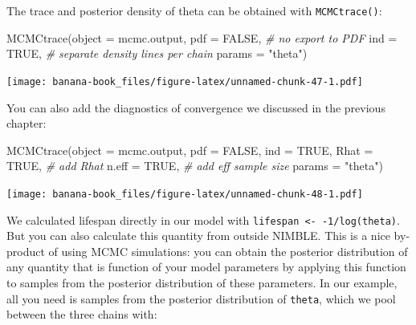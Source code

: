 \documentclass[
  12pt,
]{krantz}
\newenvironment{Shaded}{\begin{snugshade}}{\end{snugshade}}
\newcommand{\AttributeTok}[1]{\textcolor[rgb]{0.77,0.63,0.00}{#1}}
\newcommand{\CommentTok}[1]{\textcolor[rgb]{0.56,0.35,0.01}{\textit{#1}}}
\newcommand{\ConstantTok}[1]{\textcolor[rgb]{0.00,0.00,0.00}{#1}}
\newcommand{\FunctionTok}[1]{\textcolor[rgb]{0.00,0.00,0.00}{#1}}
\newcommand{\NormalTok}[1]{#1}
\newcommand{\OtherTok}[1]{\textcolor[rgb]{0.56,0.35,0.01}{#1}}
\newcommand{\SpecialCharTok}[1]{\textcolor[rgb]{0.00,0.00,0.00}{#1}}
\newcommand{\StringTok}[1]{\textcolor[rgb]{0.31,0.60,0.02}{#1}}
\begin{document}
The trace and posterior density of theta can be obtained with \texttt{MCMCtrace()}:

\begin{Shaded}
\begin{Highlighting}[]
\FunctionTok{MCMCtrace}\NormalTok{(}\AttributeTok{object =}\NormalTok{ mcmc.output,}
          \AttributeTok{pdf =} \ConstantTok{FALSE}\NormalTok{, }\CommentTok{\# no export to PDF}
          \AttributeTok{ind =} \ConstantTok{TRUE}\NormalTok{, }\CommentTok{\# separate density lines per chain}
          \AttributeTok{params =} \StringTok{"theta"}\NormalTok{)}
\end{Highlighting}
\end{Shaded}

\texttt{[image: banana-book\_files/figure-latex/unnamed-chunk-47-1.pdf]}

You can also add the diagnostics of convergence we discussed in the previous chapter:

\begin{Shaded}
\begin{Highlighting}[]
\FunctionTok{MCMCtrace}\NormalTok{(}\AttributeTok{object =}\NormalTok{ mcmc.output,}
          \AttributeTok{pdf =} \ConstantTok{FALSE}\NormalTok{,}
          \AttributeTok{ind =} \ConstantTok{TRUE}\NormalTok{,}
          \AttributeTok{Rhat =} \ConstantTok{TRUE}\NormalTok{, }\CommentTok{\# add Rhat}
          \AttributeTok{n.eff =} \ConstantTok{TRUE}\NormalTok{, }\CommentTok{\# add eff sample size}
          \AttributeTok{params =} \StringTok{"theta"}\NormalTok{)}
\end{Highlighting}
\end{Shaded}

\texttt{[image: banana-book\_files/figure-latex/unnamed-chunk-48-1.pdf]}

We calculated lifespan directly in our model with \texttt{lifespan\ \textless{}-\ -1/log(theta)}. But you can also calculate this quantity from outside NIMBLE. This is a nice by-product of using MCMC simulations: you can obtain the posterior distribution of any quantity that is function of your model parameters by applying this function to samples from the posterior distribution of these parameters. In our example, all you need is samples from the posterior distribution of \texttt{theta}, which we pool between the three chains with:

\begin{Shaded}
\end{Shaded}
\end{document}
